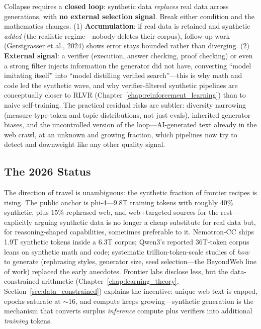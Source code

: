 \begin{keyinsight}
Collapse requires a \textbf{closed loop}: synthetic data \textit{replaces} real data across generations, with \textbf{no external selection signal}. Break either condition and the mathematics changes. (1) \textbf{Accumulation}: if real data is retained and synthetic \textit{added} (the realistic regime---nobody deletes their corpus), follow-up work (Gerstgrasser et al., 2024) shows error stays bounded rather than diverging. (2) \textbf{External signal}: a verifier (execution, answer checking, proof checking) or even a strong filter injects information the generator did not have, converting ``model imitating itself'' into ``model distilling verified search''---this is why math and code led the synthetic wave, and why verifier-filtered synthetic pipelines are conceptually closer to RLVR (Chapter~\ref{chap:reinforcement_learning}) than to naive self-training. The practical residual risks are subtler: diversity narrowing (measure type-token and topic distributions, not just evals), inherited generator biases, and the uncontrolled version of the loop---AI-generated text already in the web crawl, at an unknown and growing fraction, which pipelines now try to detect and downweight like any other quality signal.
\end{keyinsight}

\subsection{The 2026 Status}

The direction of travel is unambiguous: the synthetic fraction of frontier recipes is rising. The public anchor is phi-4---9.8T training tokens with roughly 40\% synthetic, plus 15\% rephrased web, and web+targeted sources for the rest---explicitly arguing synthetic data is no longer a cheap substitute for real data but, for reasoning-shaped capabilities, sometimes preferable to it. Nemotron-CC ships 1.9T synthetic tokens inside a 6.3T corpus; Qwen3's reported 36T-token corpus leans on synthetic math and code; systematic trillion-token-scale studies of \textit{how} to generate (rephrasing styles, generator size, seed selection---the BeyondWeb line of work) replaced the early anecdotes. Frontier labs disclose less, but the data-constrained arithmetic (Chapter~\ref{chap:learning_theory}, Section~\ref{sec:data_constrained}) explains the incentive: unique web text is capped, epochs saturate at $\sim$16, and compute keeps growing---synthetic generation is the mechanism that converts surplus \textit{inference} compute plus verifiers into additional \textit{training} tokens.

